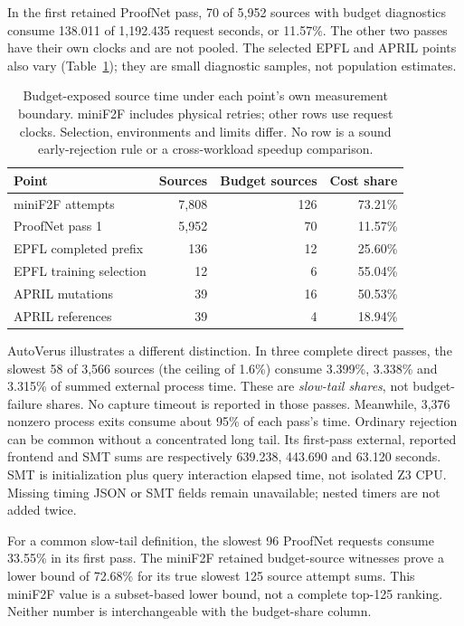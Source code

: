 \documentclass[10pt,twocolumn]{article}
\begin{document}
In the first retained ProofNet pass, 70 of 5,952 sources with budget
diagnostics consume 138.011 of 1,192.435 request seconds, or 11.57\%.
The other two passes have their own clocks and are not pooled.
The selected EPFL and APRIL points also vary (Table~\ref{tab:budget});
they are small diagnostic samples, not population estimates.

\begin{table}[t]
\centering\footnotesize
\setlength{\tabcolsep}{3pt}
\begin{tabular}{@{}lrrr@{}}
\toprule
Point & Sources & Budget sources & Cost share\\
\midrule
miniF2F attempts &7,808&126&73.21\%\\
ProofNet pass 1 &5,952&70&11.57\%\\
EPFL completed prefix &136&12&25.60\%\\
EPFL training selection &12&6&55.04\%\\
APRIL mutations &39&16&50.53\%\\
APRIL references &39&4&18.94\%\\
\bottomrule
\end{tabular}
\caption{Budget-exposed source time under each point's own measurement
boundary. miniF2F includes physical retries; other rows use request clocks.
Selection, environments and limits differ. No row is a sound early-rejection
rule or a cross-workload speedup comparison.}
\label{tab:budget}
\end{table}

AutoVerus illustrates a different distinction. In three complete direct
passes, the slowest 58 of 3,566 sources (the ceiling of 1.6\%) consume
3.399\%, 3.338\% and 3.315\% of summed external process time.
These are \emph{slow-tail shares}, not budget-failure shares.
No capture timeout is reported in those passes.
Meanwhile, 3,376 nonzero process exits consume about 95\% of each pass's
time. Ordinary rejection can be common without a concentrated long tail.
Its first-pass external, reported frontend and SMT sums are respectively
639.238, 443.690 and 63.120 seconds. SMT is initialization plus query
interaction elapsed time, not isolated Z3 CPU. Missing timing JSON or SMT
fields remain unavailable; nested timers are not added twice.

For a common slow-tail definition, the slowest 96 ProofNet requests consume
33.55\% in its first pass. The miniF2F retained budget-source witnesses prove
a lower bound of 72.68\% for its true slowest 125 source attempt sums.
This miniF2F value is a subset-based lower bound, not a complete top-125
ranking. Neither number is interchangeable with the budget-share column.
\end{document}
